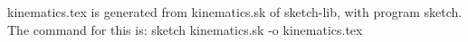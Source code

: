 \documentclass[10pt]{report}
\begin{document}
\noindent
kinematics.tex is generated from kinematics.sk of sketch-lib, with program sketch.
The command for this is:
\noindent
sketch kinematics.sk -o kinematics.tex

\begin{center}

\end{center}
\end{document}
